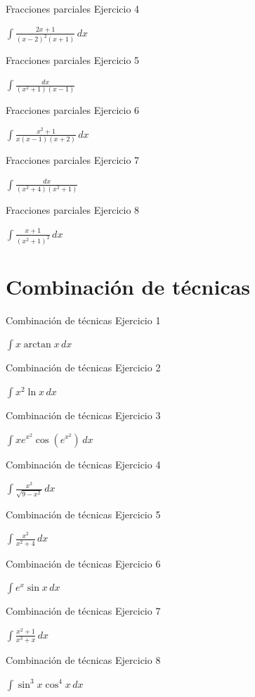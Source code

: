 \documentclass[10pt,aspectratio=169]{beamer}
\newcommand{\ejercicio}[1]{%
  \begin{center}
  \vfill
  {\fontsize{24}{30}\selectfont #1}
  \vfill
  \end{center}
}
\begin{document}
\begin{frame}{Fracciones parciales}
\small Ejercicio 4
\ejercicio{$\displaystyle \int \frac{2x+1}{(x-2)^2(x+1)}\,dx$}
\end{frame}

\begin{frame}{Fracciones parciales}
\small Ejercicio 5
\ejercicio{$\displaystyle \int \frac{dx}{(x^2+1)(x-1)}$}
\end{frame}

\begin{frame}{Fracciones parciales}
\small Ejercicio 6
\ejercicio{$\displaystyle \int \frac{x^2+1}{x(x-1)(x+2)}\,dx$}
\end{frame}

\begin{frame}{Fracciones parciales}
\small Ejercicio 7
\ejercicio{$\displaystyle \int \frac{dx}{(x^2+4)(x^2+1)}$}
\end{frame}

\begin{frame}{Fracciones parciales}
\small Ejercicio 8
\ejercicio{$\displaystyle \int \frac{x+1}{(x^2+1)^2}\,dx$}
\end{frame}

\section{Combinación de técnicas}

\begin{frame}{Combinación de técnicas}
\small Ejercicio 1
\ejercicio{$\displaystyle \int x\arctan x\,dx$}
\end{frame}

\begin{frame}{Combinación de técnicas}
\small Ejercicio 2
\ejercicio{$\displaystyle \int x^2\ln x\,dx$}
\end{frame}

\begin{frame}{Combinación de técnicas}
\small Ejercicio 3
\ejercicio{$\displaystyle \int x e^{x^2}\cos(e^{x^2})\,dx$}
\end{frame}

\begin{frame}{Combinación de técnicas}
\small Ejercicio 4
\ejercicio{$\displaystyle \int \frac{x^3}{\sqrt{9-x^2}}\,dx$}
\end{frame}

\begin{frame}{Combinación de técnicas}
\small Ejercicio 5
\ejercicio{$\displaystyle \int \frac{x^2}{x^2+4}\,dx$}
\end{frame}

\begin{frame}{Combinación de técnicas}
\small Ejercicio 6
\ejercicio{$\displaystyle \int e^x\sin x\,dx$}
\end{frame}

\begin{frame}{Combinación de técnicas}
\small Ejercicio 7
\ejercicio{$\displaystyle \int \frac{x^2+1}{x^3+x}\,dx$}
\end{frame}

\begin{frame}{Combinación de técnicas}
\small Ejercicio 8
\ejercicio{$\displaystyle \int \sin^3x\cos^4x\,dx$}
\end{frame}
\end{document}
